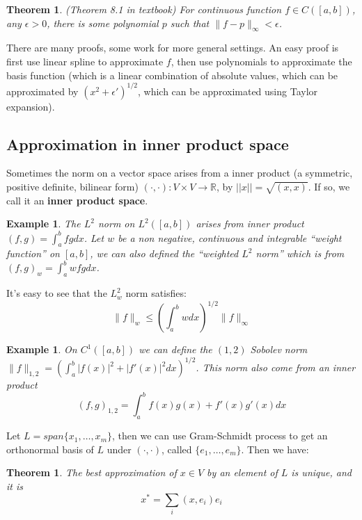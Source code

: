 \documentclass[20pt]{article} %
\theoremstyle{break}
\newtheorem{exa}[definition]{Example}
\newtheorem{thm}[definition]{Theorem}
\begin{document}
\begin{thm} (Theorem 8.1 in textbook) For continuous function $f\in C([a, b])$, any $\epsilon>0$, there is some polynomial $p$ such that $\|f-p\|_\infty<\epsilon$.
\end{thm}

There are many proofs, some work for more general settings. An easy proof is first use linear spline to approximate $f$, then use polynomials to approximate the basis function (which is a linear combination of absolute values, which can be approximated by $(x^2+\epsilon')^{1/2}$, which can be approximated using Taylor expansion).


\newpage

\subsection{Approximation in inner product space}

Sometimes the norm on a vector space arises from a inner product (a symmetric, positive definite, bilinear form) $(\cdot, \cdot): V\times V\rightarrow \mathbb{R}$, by $||x||=\sqrt{(x, x)}$. If so, we call it an {\bf inner product space}.\\

\begin{exa}The $L^2$ norm on $L^2([a, b])$ arises from inner product $(f, g)=\int_a^b fg dx$. Let $w$ be a non negative, continuous and integrable ``weight function'' on $[a, b]$, we can also defined the ``weighted $L^2$ norm'' which is from $(f, g)_w=\int_a^bwfg dx$.\end{exa}

It's easy to see that the $L^2_w$ norm satisfies:
\[\|f\|_{w}\leq(\int_a^bwdx)^{1/2}\|f\|_\infty\]

\begin{exa}On $C^1([a, b])$ we can define the $(1, 2)$ Sobolev norm $\|f\|_{1, 2}=(\int_a^b|f(x)|^2+|f'(x)|^2dx)^{1/2}$. This norm also come from an inner product
  \[(f, g)_{1, 2}=\int_a^b f(x)g(x)+f'(x)g'(x)dx\]
\end{exa}

\newpage

Let $L=span\{x_1,\dots,  x_m\}$, then we can use Gram-Schmidt process to get an orthonormal basis of $L$ under $(\cdot, \cdot)$, called $\{e_1,\dots, e_m\}$. Then we have:

\begin{thm}The best approximation of $x\in V$ by an element of $L$ is unique, and it is
  \[x^*=\sum_i(x, e_i)e_i\]
\end{thm}
\end{document}
